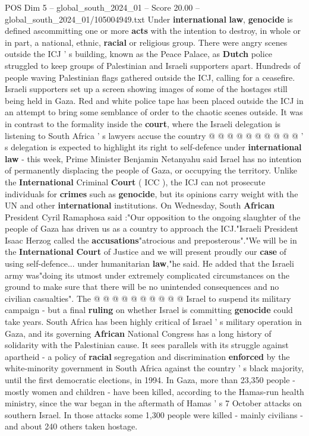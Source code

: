 \begin{textsample}{POS Dim 5 – global\_south\_2024\_01 – Score 20.00 – global\_south\_2024\_01/105004949.txt}
Under \textbf{international} \textbf{law}, \textbf{genocide} is defined ascommitting one or more \textbf{acts} with the intention to destroy, in whole or in part, a national, ethnic, \textbf{racial} or religious group.
There were angry scenes outside the ICJ ' s building, known as the Peace Palace, as \textbf{Dutch} police struggled to keep groups of Palestinian and Israeli supporters apart.
Hundreds of people waving Palestinian flags gathered outside the ICJ, calling for a ceasefire.
Israeli supporters set up a screen showing images of some of the hostages still being held in Gaza.
Red and white police tape has been placed outside the ICJ in an attempt to bring some semblance of order to the chaotic scenes outside.
It was in contrast to the formality inside the \textbf{court}, where the Israeli delegation is listening to South Africa ' s lawyers accuse the country @ @ @ @ @ @ @ @ @ @ ' s delegation is expected to highlight its right to self-defence under \textbf{international} \textbf{law} - this week, Prime Minister Benjamin Netanyahu said Israel has no intention of permanently displacing the people of Gaza, or occupying the territory.
Unlike the \textbf{International} Criminal \textbf{Court} ( ICC ), the ICJ can not prosecute individuals for \textbf{crimes} such as \textbf{genocide}, but its opinions carry weight with the UN and other \textbf{international} institutions.
On Wednesday, South \textbf{African} President Cyril Ramaphosa said :"Our opposition to the ongoing slaughter of the people of Gaza has driven us as a country to approach the ICJ."Israeli President Isaac Herzog called the \textbf{accusations}"atrocious and preposterous"."We will be in the \textbf{International} \textbf{Court} of Justice and we will present proudly our \textbf{case} of using self-defence... under humanitarian \textbf{law},"he said.
He added that the Israeli army was"doing its utmost under extremely complicated circumstances on the ground to make sure that there will be no unintended consequences and no civilian casualties".
The @ @ @ @ @ @ @ @ @ @ Israel to suspend its military campaign - but a final \textbf{ruling} on whether Israel is committing \textbf{genocide} could take years.
South Africa has been highly critical of Israel ' s military operation in Gaza, and its governing \textbf{African} National Congress has a long history of solidarity with the Palestinian cause.
It sees parallels with its struggle against apartheid - a policy of \textbf{racial} segregation and discrimination \textbf{enforced} by the white-minority government in South Africa against the country ' s black majority, until the first democratic elections, in 1994.
In Gaza, more than 23,350 people - mostly women and children - have been killed, according to the Hamas-run health ministry, since the war began in the aftermath of Hamas ' s 7 October attacks on southern Israel.
In those attacks some 1,300 people were killed - mainly civilians - and about 240 others taken hostage.

\end{textsample}
